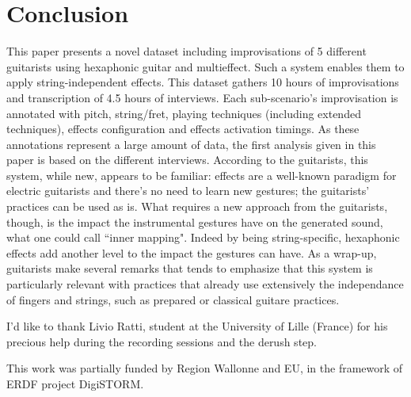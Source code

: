 \documentclass{article}
\begin{document}
\section{Conclusion}\label{sec:conclusion}
This paper presents a novel dataset including improvisations of 5 different guitarists using hexaphonic guitar and multieffect. Such a system enables them to apply string-independent effects. This dataset gathers 10 hours of improvisations and transcription of 4.5 hours of interviews. 
Each sub-scenario's improvisation is annotated with pitch, string/fret, playing techniques (including extended techniques), effects configuration and effects activation timings. As these annotations represent a large amount of data, the first analysis given in this paper is based on the different interviews. According to the guitarists, this system, while new, appears to be familiar: effects are a well-known paradigm for electric guitarists and there's no need to learn new gestures; the guitarists' practices can be used as is. What requires a new approach from the guitarists, though, is the impact the instrumental gestures have on the generated sound, what one could call ``inner mapping".  Indeed by being string-specific, hexaphonic effects add another level to the impact the gestures can have.
As a wrap-up, guitarists make several remarks that tends to emphasize that this system is particularly relevant with practices that already use extensively the independance of fingers and strings, such as prepared or classical guitare practices.



\begin{acknowledgments}
I'd like to thank Livio Ratti, student at the University of Lille (France) for his precious help during the recording sessions and the derush step. 

This work was partially funded by Region Wallonne and EU, in the framework of ERDF project DigiSTORM.
\end{acknowledgments} 


\end{document}
